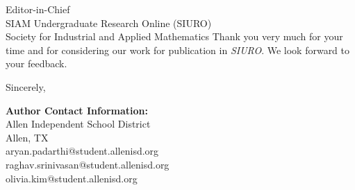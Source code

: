 \documentclass[11pt]{letter}
\begin{document}
\begin{letter}{
  Editor-in-Chief \\
  SIAM Undergraduate Research Online (SIURO) \\
  Society for Industrial and Applied Mathematics
}
Thank you very much for your time and for considering our work for publication in \textit{SIURO}. We look forward to your feedback.

\closing{Sincerely,}

\vspace{1cm}
\noindent\textbf{Author Contact Information:}\\
Allen Independent School District \\
Allen, TX \\
aryan.padarthi@student.allenisd.org \\
raghav.srinivasan@student.allenisd.org \\
olivia.kim@student.allenisd.org


\end{letter}
\end{document}
